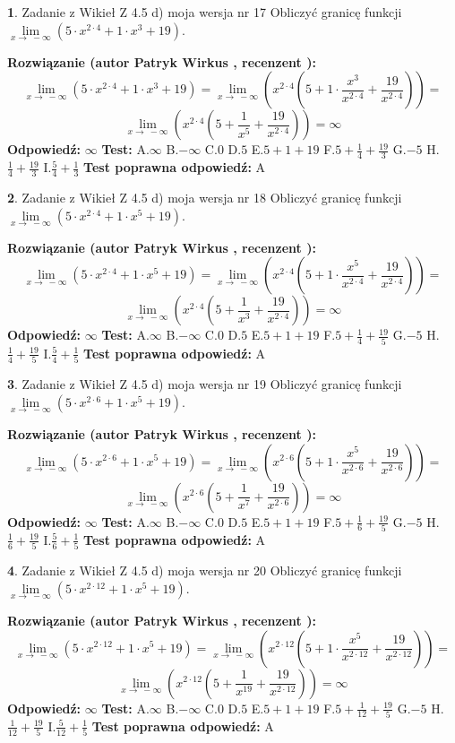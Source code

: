 \documentclass[12pt, a4paper]{article}
\theoremstyle{definition} %
\newtheorem{zad}{}
\newcommand{\zadStart}[1]{\begin{zad}#1\newline}
\newcommand{\zadStop}{\end{zad}}
\newcommand{\rozwStart}[2]{\noindent \textbf{Rozwiązanie (autor #1 , recenzent #2): }\newline}
\newcommand{\rozwStop}{\newline}
\newcommand{\odpStart}{\noindent \textbf{Odpowiedź:}\newline}
\newcommand{\odpStop}{\newline}
\newcommand{\testStart}{\noindent \textbf{Test:}\newline}
\newcommand{\testStop}{\newline}
\newcommand{\kluczStart}{\noindent \textbf{Test poprawna odpowiedź:}\newline}
\newcommand{\kluczStop}{\newline}
\begin{document}
\zadStart{Zadanie z Wikieł Z 4.5 d) moja wersja nr 17}
Obliczyć granicę funkcji  $\lim\limits_{x\to\ -\infty}(5 \cdot x^{2\cdot4}+1 \cdot x^{3}+19)$.
\zadStop
\rozwStart{Patryk Wirkus}{}
$$\lim\limits_{x\to\ -\infty}(5 \cdot x^{2\cdot4}+1 \cdot x^{3}+19) = \lim\limits_{x\to\ -\infty}(x^{2\cdot4}(5 +1 \cdot \frac{x^{3}}{x^{2\cdot4}}+\frac{19}{x^{2\cdot4}})) =$$ $$\lim\limits_{x\to\ -\infty}(x^{2\cdot4}(5 +\frac{1}{x^{5}}+\frac{19}{x^{2\cdot4}})) =\infty$$
\rozwStop
\odpStart
$\infty$
\odpStop
\testStart
A.$\infty$ B.$-\infty$ C.$0$ D.$5$ E.$5 + 1 + 19$
F.$5+\frac{1}{4}+\frac{19}{3}$ G.$-5$
H.$\frac{1}{4}+\frac{19}{3}$
I.$\frac{5}{4}+\frac{1}{3}$
\testStop
\kluczStart
A
\kluczStop



\zadStart{Zadanie z Wikieł Z 4.5 d) moja wersja nr 18}
Obliczyć granicę funkcji  $\lim\limits_{x\to\ -\infty}(5 \cdot x^{2\cdot4}+1 \cdot x^{5}+19)$.
\zadStop
\rozwStart{Patryk Wirkus}{}
$$\lim\limits_{x\to\ -\infty}(5 \cdot x^{2\cdot4}+1 \cdot x^{5}+19) = \lim\limits_{x\to\ -\infty}(x^{2\cdot4}(5 +1 \cdot \frac{x^{5}}{x^{2\cdot4}}+\frac{19}{x^{2\cdot4}})) =$$ $$\lim\limits_{x\to\ -\infty}(x^{2\cdot4}(5 +\frac{1}{x^{3}}+\frac{19}{x^{2\cdot4}})) =\infty$$
\rozwStop
\odpStart
$\infty$
\odpStop
\testStart
A.$\infty$ B.$-\infty$ C.$0$ D.$5$ E.$5 + 1 + 19$
F.$5+\frac{1}{4}+\frac{19}{5}$ G.$-5$
H.$\frac{1}{4}+\frac{19}{5}$
I.$\frac{5}{4}+\frac{1}{5}$
\testStop
\kluczStart
A
\kluczStop



\zadStart{Zadanie z Wikieł Z 4.5 d) moja wersja nr 19}
Obliczyć granicę funkcji  $\lim\limits_{x\to\ -\infty}(5 \cdot x^{2\cdot6}+1 \cdot x^{5}+19)$.
\zadStop
\rozwStart{Patryk Wirkus}{}
$$\lim\limits_{x\to\ -\infty}(5 \cdot x^{2\cdot6}+1 \cdot x^{5}+19) = \lim\limits_{x\to\ -\infty}(x^{2\cdot6}(5 +1 \cdot \frac{x^{5}}{x^{2\cdot6}}+\frac{19}{x^{2\cdot6}})) =$$ $$\lim\limits_{x\to\ -\infty}(x^{2\cdot6}(5 +\frac{1}{x^{7}}+\frac{19}{x^{2\cdot6}})) =\infty$$
\rozwStop
\odpStart
$\infty$
\odpStop
\testStart
A.$\infty$ B.$-\infty$ C.$0$ D.$5$ E.$5 + 1 + 19$
F.$5+\frac{1}{6}+\frac{19}{5}$ G.$-5$
H.$\frac{1}{6}+\frac{19}{5}$
I.$\frac{5}{6}+\frac{1}{5}$
\testStop
\kluczStart
A
\kluczStop



\zadStart{Zadanie z Wikieł Z 4.5 d) moja wersja nr 20}
Obliczyć granicę funkcji  $\lim\limits_{x\to\ -\infty}(5 \cdot x^{2\cdot12}+1 \cdot x^{5}+19)$.
\zadStop
\rozwStart{Patryk Wirkus}{}
$$\lim\limits_{x\to\ -\infty}(5 \cdot x^{2\cdot12}+1 \cdot x^{5}+19) = \lim\limits_{x\to\ -\infty}(x^{2\cdot12}(5 +1 \cdot \frac{x^{5}}{x^{2\cdot12}}+\frac{19}{x^{2\cdot12}})) =$$ $$\lim\limits_{x\to\ -\infty}(x^{2\cdot12}(5 +\frac{1}{x^{19}}+\frac{19}{x^{2\cdot12}})) =\infty$$
\rozwStop
\odpStart
$\infty$
\odpStop
\testStart
A.$\infty$ B.$-\infty$ C.$0$ D.$5$ E.$5 + 1 + 19$
F.$5+\frac{1}{12}+\frac{19}{5}$ G.$-5$
H.$\frac{1}{12}+\frac{19}{5}$
I.$\frac{5}{12}+\frac{1}{5}$
\testStop
\kluczStart
A
\kluczStop
\end{document}
